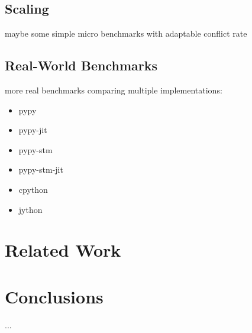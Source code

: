 \documentclass{sigplanconf}
\begin{document}
\subsection{Scaling}

maybe some simple micro benchmarks with adaptable conflict rate


\subsection{Real-World Benchmarks\label{sec:real-world-bench}}

more real benchmarks comparing multiple implementations:
\begin{itemize}[noitemsep]
\item pypy
\item pypy-jit
\item pypy-stm
\item pypy-stm-jit
\item cpython
\item jython
\end{itemize}


\section{Related Work}


\section{Conclusions}




\acks
...




\end{document}
